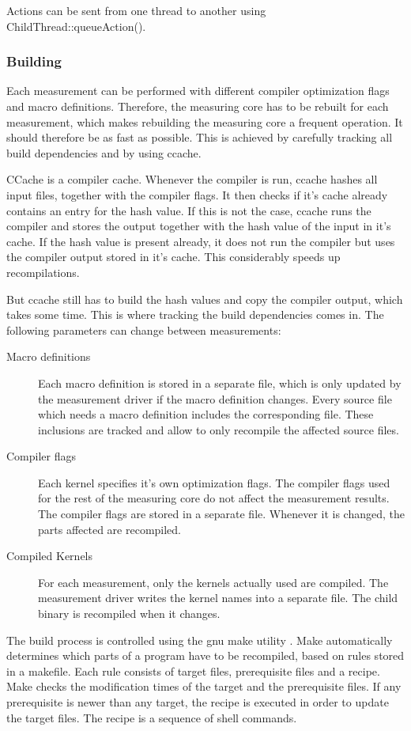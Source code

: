 \documentclass[a4paper,12pt]{article}
\newcommand{\method}[1]{\textsf{#1}}
\begin{document}
Actions can be sent from one thread to another using
\method{ChildThread::queueAction()}. 

\subsubsection{Building}
Each measurement can be performed with different compiler optimization flags and
macro definitions. Therefore, the measuring core has to be rebuilt for each
measurement, which makes rebuilding the measuring core a frequent operation. It
should therefore be as fast as possible. This is achieved by carefully tracking
all build dependencies and by using ccache. 

CCache is a compiler cache. Whenever the compiler is run, ccache hashes all
input files, together with the compiler flags. It then checks if it's cache
already contains an entry for the hash value. If this is not the case, ccache
runs the compiler and stores the output together with the hash value of the
input in it's cache. If the hash value is present already, it does not run the
compiler but uses the compiler output stored in it's cache. This considerably
speeds up recompilations.

But ccache still has to build the hash values and copy the compiler output,
which takes some time. This is where tracking the build dependencies comes in.
The following parameters can change between measurements:
\begin{description}
\item[Macro definitions]
Each macro definition is stored in a separate file, which is only updated by the
measurement driver if the macro definition changes. Every source file which
needs a macro definition includes the corresponding file. These inclusions are
tracked and allow to only recompile the affected source files.
\item[Compiler flags] 
Each kernel specifies it's own optimization flags. The compiler flags used for
the rest of the measuring core do not affect the measurement results. The compiler
flags are stored in a separate file. Whenever it is changed, the parts affected
are recompiled.
\item[Compiled Kernels]
For each measurement, only the kernels actually used are compiled. The
measurement driver writes the kernel names into a separate file. The child
binary is recompiled when it changes.
\end{description}

The build process is controlled using the gnu make utility \cite{make}. Make
automatically determines which parts of a program have to be recompiled, based
on rules stored in a makefile. Each rule consists of target files, prerequisite
files and a recipe. Make checks the modification times of the target and the
prerequisite files. If any prerequisite is newer than any target, the recipe is
executed in order to update the target files. The recipe is a sequence of shell
commands.
\end{document}
